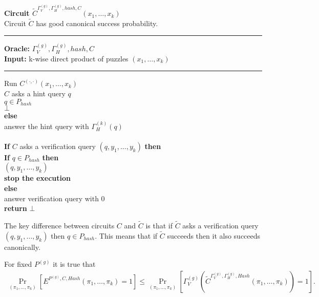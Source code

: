 \begin{codeblock}
  \textbf{Circuit $\widetilde{C}^{\Gamma_V^{(g)}, \Gamma_H^{(g)}, hash, C} (x_1, \dots, x_k)$} \\
  Circuit $\widetilde{C}$ has good canonical success probability.
  \medskip

  \hrule

  \medskip

  \textbf{Oracle:} $\Gamma_V^{(g)}, \Gamma_H^{(g)}, hash, C$ \\
  \textbf{Input:} k-wise direct product of puzzles $(x_1, \dots, x_k)$

  \medskip\hrule\medskip
  Run $C^{(\cdot,\cdot)}(x_1, \dots, x_k)$ \\
  \IndI \If $C$ asks a hint query $q$ \then\\
  \IndII \If $q \in P_{hash}$ \then\\
  \IndIII \return $\bot$\\
  \IndII \textbf{else}\\
  \IndIII answer the hint query with $\Gamma_H^{(k)}(q)$\\
  \\
  \IndI \textbf{If} $C$ asks a verification query $(q, y_1, \dots, y_k)$ \textbf{then} \\
  \IndII \textbf{If} $q \in P_{hash}$ \textbf{then} \\
  \IndIII {} $(q, y_1, \dots, y_k)$ \\
  \IndIII \textbf{stop the execution} \\
  \IndII \textbf{else} \\
  \IndIII answer verification query with 0 \\
  \textbf{return} $\bot$
\end{codeblock}
The key difference between circuits $C$ and $\widetilde{C}$
is that if $\widetilde{C}$ asks a verification query $(q, y_1, \dots, y_k)$ then $q \in P_{hash}$.
This means that if $\widetilde{C}$ succeeds then it also succeeds canonically.

\begin{lemma}
  For fixed $P^{(g)}$ it is true that
  \begin{align*}
  \underset{(\pi_1, \dots, \pi_k)}{\Pr}[E^{P^{(g)}, C, Hash}(\pi_1, \dots, \pi_k) = 1] \leq \underset{(\pi_1, \dots, \pi_k)}{\Pr}[\Gamma_V^{(g)} (\widetilde{C}^{\Gamma_V^{(g)}, \Gamma_H^{(g)}, Hash}(\pi_1, \dots, \pi_k)) = 1].
  \end{align*}
\end{lemma}

